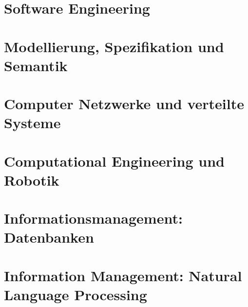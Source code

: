 \documentclass[english, notodo]{fdsummary}
\newcommand{\lstbasepath}{unset}
\begin{document}
	\cleardoublepage
	\part{Software Engineering}
	\graphicspath{{./cs/mandatory/fs3/se/}}
	\renewcommand{\lstbasepath}{./cs/mandatory/fs3/se}
	
	
	\cleardoublepage
	\part{Modellierung, Spezifikation und Semantik}
	\graphicspath{{./cs/mandatory/fs3/moses/}}
	\renewcommand{\lstbasepath}{./cs/mandatory/fs3/moses}
	
	
	\cleardoublepage
	\part{Computer Netzwerke und verteilte Systeme}
	\graphicspath{{./cs/mandatory/fs4/cnuvs/}}
	\renewcommand{\lstbasepath}{./cs/mandatory/fs4/cnuvs}
	
	
	\cleardoublepage
	\part{Computational Engineering und Robotik}
	\graphicspath{{./cs/mandatory/fs4/cer/}}
	\renewcommand{\lstbasepath}{./cs/mandatory/fs4/cer}
	
	
	\cleardoublepage
	\part{Informationsmanagement: Datenbanken}
	\graphicspath{{./cs/mandatory/fs4/infman-db/}}
	\renewcommand{\lstbasepath}{./cs/mandatory/fs4/infman-db}
	
	\cleardoublepage
	\part{Information Management: Natural Language Processing}
	\graphicspath{{./cs/mandatory/fs4/infman-nlp/}}
	\renewcommand{\lstbasepath}{./cs/mandatory/fs4/infman-nlp}
	
\end{document}
